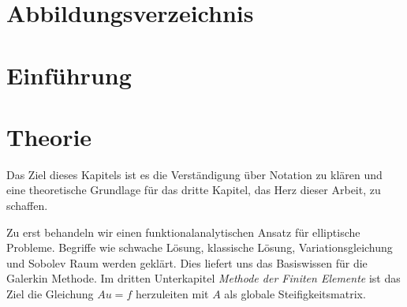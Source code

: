 \documentclass[12pt,a4paper]{scrartcl}
\numberwithin{equation}{section}
\begin{document}


\newpage
\setcounter{page}{2}
\renewcommand{\listfigurename}{}
\section*{Abbildungsverzeichnis}
\listoffigures









\newpage
\pagestyle{plain}



\setcounter{page}{1}
\section{Einführung}






\newpage

\section{Theorie}
Das Ziel dieses Kapitels ist es die Verständigung über Notation zu klären und eine theoretische Grundlage für das dritte Kapitel, das Herz dieser Arbeit, zu schaffen.

Zu erst behandeln wir einen funktionalanalytischen Ansatz für elliptische Probleme. Begriffe wie schwache Lösung, klassische Lösung, Variationsgleichung und Sobolev Raum werden geklärt. Dies liefert uns das Basiswissen für die Galerkin Methode. 
Im dritten Unterkapitel \textit{Methode der Finiten Elemente} ist das Ziel die Gleichung $Au=f$ herzuleiten mit $A$ als globale Steifigkeitsmatrix.
\end{document}
